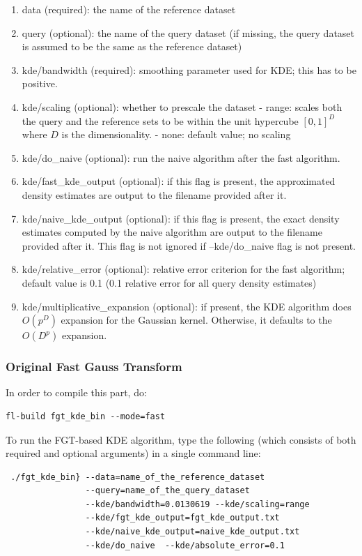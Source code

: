 \documentclass[letter]{report}
\begin{document}
\begin{enumerate}
\item{data (required): the name of the reference dataset}
\item{query (optional): the name of the query dataset (if missing, the
 query dataset is assumed to be the same as the reference dataset)}
\item{kde/bandwidth (required): smoothing parameter used for KDE; this
 has to be positive.}
\item{kde/scaling (optional): whether to prescale the dataset - range:
scales both the query and the reference sets to be within the unit
hypercube $[0, 1]^D$ where $D$ is the dimensionality.  - none: default
value; no scaling}
\item{kde/do\_naive (optional): run the naive algorithm after the fast
algorithm.}
\item{kde/fast\_kde\_output (optional): if this flag is present, the
approximated density estimates are output to the filename provided
after it.}
\item{kde/naive\_kde\_output (optional): if this flag is present, the
 exact density estimates computed by the naive algorithm are output to
 the filename provided after it. This flag is not ignored if
 --kde/do\_naive flag is not present.}
\item{kde/relative\_error (optional): relative error criterion for the
 fast algorithm; default value is 0.1 (0.1 relative error for all
 query density estimates)}
\item{kde/multiplicative\_expansion (optional): if present, the KDE
algorithm does $O(p^D)$ expansion for the Gaussian kernel. Otherwise,
it defaults to the $O(D^p)$ expansion.}
\end{enumerate}

\subsubsection{Original Fast Gauss Transform}
In order to compile this part, do: 
\begin{verbatim}
fl-build fgt_kde_bin --mode=fast
\end{verbatim}

 To run the FGT-based KDE algorithm, type the
following (which consists of both required and optional arguments) in
a single command line:
\begin{verbatim}
 ./fgt_kde_bin} --data=name_of_the_reference_dataset
                --query=name_of_the_query_dataset
                --kde/bandwidth=0.0130619 --kde/scaling=range
                --kde/fgt_kde_output=fgt_kde_output.txt
                --kde/naive_kde_output=naive_kde_output.txt
                --kde/do_naive  --kde/absolute_error=0.1
\end{verbatim}
\end{document}
